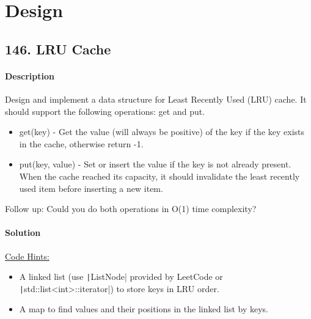 \section{Design}

\subsection{146. LRU Cache}

\paragraph{\color{white} \colorbox{Mahogany}{Description}}
Design and implement a data structure for Least Recently Used (LRU) cache. It should support the following operations: get and put.
\begin{itemize}
    \item get(key) - Get the value (will always be positive) of the key if the key exists in the cache, otherwise return -1.
    \item put(key, value) - Set or insert the value if the key is not already present. When the cache reached its capacity, it should invalidate the least recently used item before inserting a new item.
\end{itemize}

Follow up:
Could you do both operations in O(1) time complexity?

\paragraph{\color{white} \colorbox{OliveGreen}{Solution}}
\underline{Code Hints:}
\begin{itemize}
    \item A linked list (use \texttt|ListNode| provided by LeetCode or \texttt|std::list<int>::iterator|) to store keys in LRU order.
    \item A map to find values and their positions in the linked list by keys.
\end{itemize}